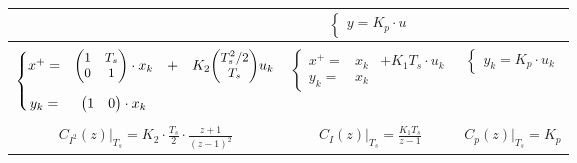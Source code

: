 \begin{table}[H]
{\begin{tabular}[t]{||c||c||c||}
			                                                                          &
			$\left\{\begin{matrix}
					y = K_p \cdot u
				\end{matrix}\right. $                                                                                                   \\[9mm]
			\hline\hline
			                                                                          &                                        &                         \\[-3mm]
			{\normalsize $ \left\{\begin{matrix}
					x^+ = & {\small \begin{pmatrix}
								1 & T_s \\
								0 & 1
							\end{pmatrix}} \cdot x_k & + & K_2 {\small \begin{pmatrix}
						T_s^2/2 \\
						T_s
					\end{pmatrix}} u_k \\
					      &                                                                                                 \\[-1mm]
					y_k = & \begin{pmatrix}
						1 & 0
					\end{pmatrix} \cdot x_k
				\end{matrix}\right. $
			}                                                                         &
			{\normalsize $ \left\{\begin{matrix}
							x^+ = & x_k & + K_1 T_s \cdot u_k \\
							y_k = & x_k
						\end{matrix}\right.$

			}                                                                         &
			$\left\{\begin{matrix}
					y_k        = K_p \cdot u_k
				\end{matrix}\right. $                                                                                                  \\[9mm]
			                                                                          &                                        &                         \\[-3mm]
			$ C_{I^2}(z)|_{T_s} = K_2 \cdot \frac{T_s}{2} \cdot \frac{z+1}{(z -1)^2}$ & $ C_I(z)|_{T_s} = \frac{K_1 T_s}{z-1}$ & $ C_p(z)|_{T_s} = K_p $ \\[2mm]

			\hline
		\end{tabular}
	}%
\end{table}\vspace{-3mm}

